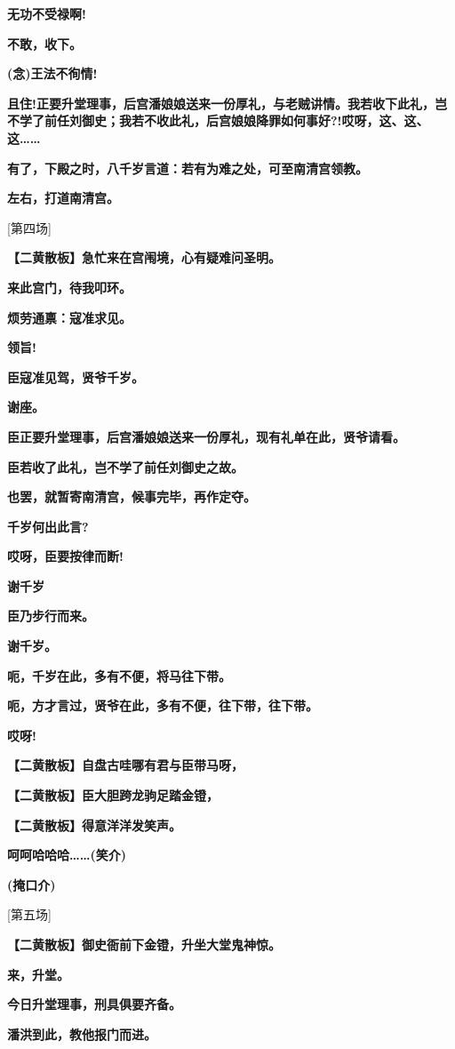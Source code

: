 \textbf{无功不受禄啊!}

\textbf{不敢，收下。}

\textbf{(念)王法不徇情!}

\textbf{且住!正要升堂理事，后宫潘娘娘送来一份厚礼，与老贼讲情。我若收下此礼，岂不学了前任刘御史；我若不收此礼，后宫娘娘降罪如何事好?!哎呀，这、这、这\ldots{}\ldots{}}

\textbf{有了，下殿之时，八千岁言道：若有为难之处，可至南清宫领教。}

\textbf{左右，打道南清宫。}

{[}第四场{]}

\textbf{【二黄散板】急忙来在宫闱境，心有疑难问圣明。}

\textbf{来此宫门，待我叩环。}

\textbf{烦劳通禀：寇准求见。}

\textbf{领旨!}

\textbf{臣寇准见驾，贤爷千岁。}

\textbf{谢座。}

\textbf{臣正要升堂理事，后宫潘娘娘送来一份厚礼，现有礼单在此，贤爷请看。}

\textbf{臣若收了此礼，岂不学了前任刘御史之故。}

\textbf{也罢，就暂寄南清宫，候事完毕，再作定夺。}

\textbf{千岁何出此言?}

\textbf{哎呀，臣要按律而断!}

\textbf{谢千岁}

\textbf{臣乃步行而来。}

\textbf{谢千岁。}

\textbf{呃，千岁在此，多有不便，将马往下带。}

\textbf{呃，方才言过，贤爷在此，多有不便，往下带，往下带。}

\textbf{哎呀!}

\textbf{【二黄散板】自盘古哇哪有君与臣带马呀，}

\textbf{【二黄散板】臣大胆跨龙驹足踏金镫，}

\textbf{【二黄散板】得意洋洋发笑声。}

\textbf{呵呵哈哈哈\ldots{}\ldots{}(笑介)}

\textbf{(掩口介)}

{[}第五场{]}

\textbf{【二黄散板】御史衙前下金镫，升坐大堂鬼神惊。}

\textbf{来，升堂。}

\textbf{今日升堂理事，刑具俱要齐备。}

\textbf{潘洪到此，教他报门而进。}

